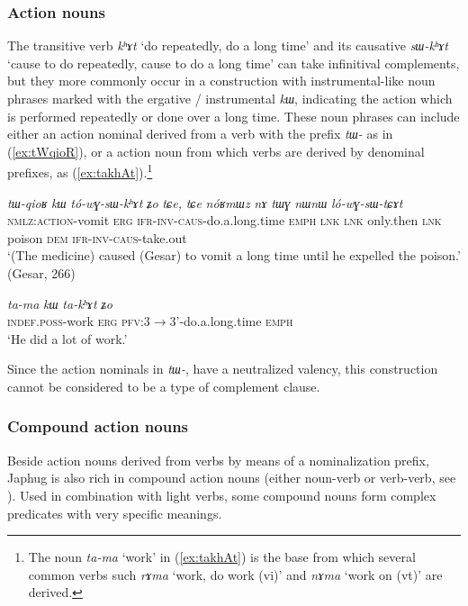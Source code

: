 \documentclass[oneside,a4paper,11pt]{article}
\newcommand{\ipa}[1]{\textit{\phon#1}}
\newcommand{\jpg}[2]{\ipa{#1} `#2'}
\newcommand{\refb}[1]{(\ref{#1})}
\begin{document}
  \subsubsection{Action nouns}  \label{sec:nouns}
 The transitive verb \jpg{kʰɤt}{do repeatedly, do a long time} and its causative  \jpg{sɯ-kʰɤt}{cause to do repeatedly, cause to do a long time} can take infinitival complements, but they more commonly occur in a construction with instrumental-like noun phrases marked with the ergative / instrumental \ipa{kɯ}, indicating the action which is performed repeatedly or done over a long time. These noun phrases can include either an action nominal derived from a verb with the prefix \ipa{tɯ-} as in \refb{ex:tWqioR}, or a action noun from which verbs are derived by denominal prefixes, as \refb{ex:takhAt}.\footnote{The noun \jpg{ta-ma}{work} in \refb{ex:takhAt} is the base from which several common verbs such \jpg{rɤma}{work, do work (vi)} and \jpg{nɤma}{work on (vt)} are derived.  }
 
  \begin{exe}
\ex \label{ex:tWqioR}
\gll \ipa{tɯ-qioʁ}	\ipa{kɯ}	\ipa{tó-wɣ-sɯ-kʰɤt}	\ipa{ʑo}	\ipa{tɕe,}	\ipa{tɕe}	\ipa{nóʁmɯz}	\ipa{nɤ}	\ipa{tɯɣ}	\ipa{nɯnɯ}	\ipa{ló-wɣ-sɯ-tɕɤt} \\
\textsc{nmlz:action}-vomit \textsc{erg} \textsc{ifr-inv-caus}-do.a.long.time \textsc{emph} \textsc{lnk} \textsc{lnk} only.then \textsc{lnk} poison \textsc{dem} \textsc{ifr-inv-caus}-take.out \\
\glt `(The medicine) caused (Gesar) to vomit a long time until he expelled the poison.' (Gesar, 266)
\end{exe}

  \begin{exe}
\ex \label{ex:takhAt}
\gll 
\ipa{ta-ma}	\ipa{kɯ}	\ipa{ta-kʰɤt}	\ipa{ʑo} \\
\textsc{indef.poss}-work \textsc{erg} \textsc{pfv}:3$\rightarrow$3'-do.a.long.time \textsc{emph} \\
\glt `He did a lot of work.'
\end{exe}

Since the action nominals in \ipa{tɯ-}, have a neutralized valency, this construction cannot be considered to be a type of complement clause.
 
\subsubsection{Compound action nouns} \label{sec:compound}
Beside action nouns derived from verbs by means of a nominalization prefix, Japhug is also rich in compound action nouns (either noun-verb or verb-verb, see \citealt{jacques12incorp}). Used in combination with light verbs, some compound nouns form complex predicates with very specific meanings.
\end{document}
